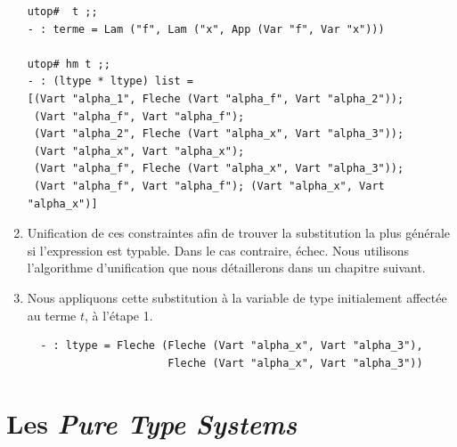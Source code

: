 \documentclass[11pt]{book}
\begin{document}
\begin{enumerate}
\begin{Verbatim}
utop#  t ;;
- : terme = Lam ("f", Lam ("x", App (Var "f", Var "x")))

utop# hm t ;;
- : (ltype * ltype) list =
[(Vart "alpha_1", Fleche (Vart "alpha_f", Vart "alpha_2"));
 (Vart "alpha_f", Vart "alpha_f");
 (Vart "alpha_2", Fleche (Vart "alpha_x", Vart "alpha_3"));
 (Vart "alpha_x", Vart "alpha_x");
 (Vart "alpha_f", Fleche (Vart "alpha_x", Vart "alpha_3"));
 (Vart "alpha_f", Vart "alpha_f"); (Vart "alpha_x", Vart "alpha_x")]
\end{Verbatim}
    
  \item Unification de ces constraintes afin de trouver la substitution la plus générale si l'expression est typable. 
  Dans le cas contraire, échec. Nous utilisons l'algorithme d'unification que nous détaillerons dans un chapitre suivant.

  \item Nous appliquons cette substitution à la variable de type initialement affectée au terme $t$, à l'étape 1.
\begin{Verbatim}
  - : ltype = Fleche (Fleche (Vart "alpha_x", Vart "alpha_3"),
                      Fleche (Vart "alpha_x", Vart "alpha_3"))
\end{Verbatim}
\end{enumerate}

\section{Les \textit{Pure Type Systems}}
\end{document}
